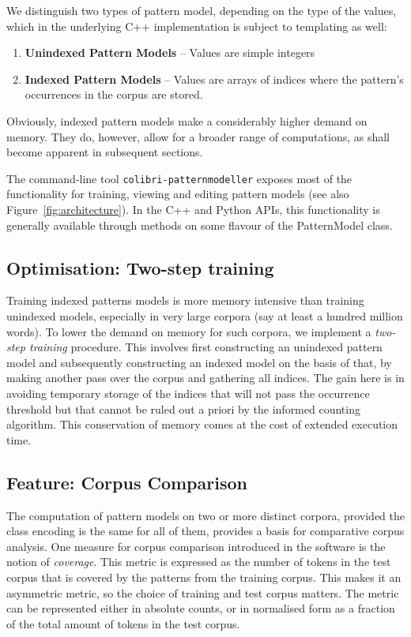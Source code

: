 We distinguish two types of pattern model, depending on the type of the values,
which in the underlying C++ implementation is subject to templating as well:

\begin{enumerate}
 \item \textbf{Unindexed Pattern Models} -- Values are simple integers
 \item \textbf{Indexed Pattern Models} -- Values are arrays of indices where
     the pattern's occurrences in the corpus are stored.
\end{enumerate}

Obviously, indexed pattern models make a considerably higher demand on memory.
They do, however, allow for a broader range of computations, as shall become
apparent in subsequent sections.

The command-line tool \texttt{colibri-patternmodeller} exposes most of the
functionality for training, viewing and editing pattern models (see also
Figure~\ref{fig:architecture}). In the C++ and Python APIs, this functionality is
generally available through methods on some flavour of the PatternModel class.

\subsection*{Optimisation: Two-step training}

Training indexed patterns models is more memory intensive than training
unindexed models, especially in very large corpora (say at least a hundred
million words). To lower the demand on memory for such corpora, we implement a
\emph{two-step training} procedure. This involves first constructing an
unindexed pattern model and subsequently constructing an indexed model on the
basis of that, by making another pass over the corpus and gathering all
indices. The gain here is in avoiding temporary storage of the indices that
will not pass the occurrence threshold but that cannot be ruled out a priori by the
informed counting algorithm.  This conservation of memory comes at the cost of
extended execution time.

\subsection*{Feature: Corpus Comparison}

The computation of pattern models on two or more distinct corpora, provided the
class encoding is the same for all of them, provides a basis for comparative
corpus analysis. One measure for corpus comparison introduced in the software
is the notion of \emph{coverage}. This metric is expressed as the number of
tokens in the test corpus that is covered by the patterns from the training
corpus. This makes it an asymmetric metric, so the choice of training and test corpus
matters.  The metric can be represented either in absolute counts, or in
normalised form as a fraction of the total amount of tokens in the test corpus.


